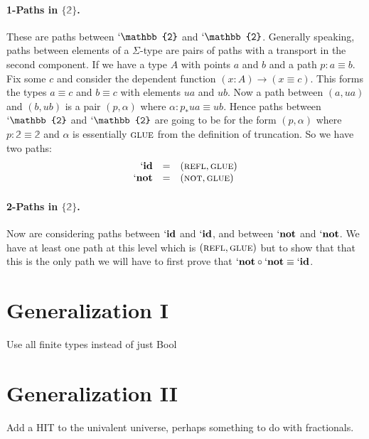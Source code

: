 \documentclass[format=acmlarge,review,natbib]{acmart}
\newcommand{\reflp}{\textsc{refl}}
\newcommand{\notp}{\textsc{not}}
\newcommand{\gluep}{\textsc{glue}}
\newcommand{\bt}{\mathbb{2}}
\begin{document}
\paragraph*{1-Paths in $\{\bt\}$.} These are paths between $`\bt$ and
$`\bt$. Generally speaking, paths between elements of a $\Sigma$-type are pairs
of paths with a transport in the second component. If we have a type $A$ with
points $a$ and $b$ and a path $p : a \equiv b$. Fix some $c$ and consider the
dependent function $(x:A) \rightarrow (x \equiv c)$. This forms the types
$a\equiv c$ and $b\equiv c$ with elements $ua$ and $ub$. Now a path between
$(a,ua)$ and $(b,ub)$ is a pair $(p,\alpha)$ where $\alpha : p_* ua \equiv
ub$. Hence paths between $`\bt$ and $`\bt$ are going to be for the form
$(p,\alpha)$ where $p : \bt \equiv \bt$ and $\alpha$ is essentially $\gluep$
from the definition of truncation. So we have two paths:
\[\begin{array}{rcl}
`\mathbf{id} &=& (\reflp,\gluep) \\
`\mathbf{not} &=& (\notp,\gluep)
\end{array}\]

\paragraph*{2-Paths in $\{\bt\}$.} Now are considering paths between
$`\mathbf{id}$ and $`\mathbf{id}$, and between $`\mathbf{not}$ and
$`\mathbf{not}$. We have at least one path at this level which is
$(\reflp,\gluep)$ but to show that that this is the only path we will have to
first prove that $`\mathbf{not} \circ `\mathbf{not} \equiv `\mathbf{id}$.

\section{Generalization I}

Use all finite types instead of just Bool

\section{Generalization II}

Add a HIT to the univalent universe, perhaps something to do with fractionals.



{\footnotesize

}
\end{document}
